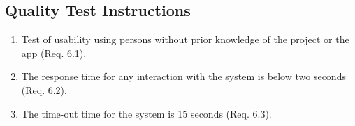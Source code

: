 \documentclass[a4paper]{article}
\newlength{\testlabellength}
\newenvironment{testlist}{\begin{enumerate}[label=\bfseries Instruction \thesubsection.\arabic* , labelindent=0pt, labelwidth=\testlabellength , leftmargin=2cm]}{\end{enumerate}}
\newenvironment{precondition}{
{\color{white}BLARG}\\ 
\textbf{Precondition}
\begin{itemize}[labelindent=0cm, labelwidth=2cm , leftmargin=1cm]
}
{\end{itemize}}
\newenvironment{instruction}{
\textbf{Instructions:}
\begin{enumerate}[label=\bfseries  \arabic*., labelindent=0cm, labelwidth=2cm , leftmargin=1cm]
}
{\end{enumerate}}
\newenvironment{postcondition}{
\textbf{Postcondition:}
\begin{itemize}[labelindent=0cm, labelwidth=2cm , leftmargin=1cm]
}
{\end{itemize}}
\begin{document}
\begin{appendices}
\subsection{Quality Test Instructions}

\begin{testlist}

	\item Test of usability using persons without prior knowledge of the project or the app (Req. 6.1).

	\item The response time for any interaction with the system is below two seconds (Req. 6.2).

	\item The time-out time for the system is 15 seconds (Req. 6.3). 
	
\end{testlist}

\clearpage

\end{appendices}
\end{document}
